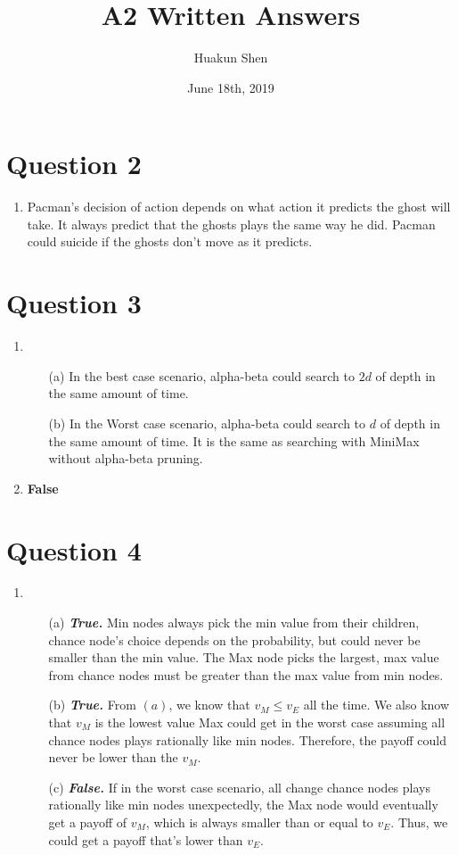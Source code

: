 \documentclass[10pt]{article}
\title{A2 Written Answers}
\author{Huakun Shen}
\date{June 18th, 2019}
\begin{document}
\maketitle
\section*{Question 2}
\begin{enumerate}
\item Pacman's decision of action depends on what action it predicts the ghost will take. It always predict that the ghosts plays the same way he did. Pacman could suicide if the ghosts don't move as it predicts.
\end{enumerate}
\section*{Question 3}
\begin{enumerate}
\item 
	\begin{enumerate}
		\item[(a)] In the best case scenario, alpha-beta could search to $2d$ of depth in the same amount of time.
		\item[(b)] In the Worst case scenario, alpha-beta could search to $d$ of depth in the same amount of time. It is the same as searching with MiniMax without alpha-beta pruning.
	\end{enumerate}
\item \textbf{False}
\end{enumerate}
\section*{Question 4}
\begin{enumerate}
\item
	\begin{enumerate}
	\item[(a)] \textbf{\textit{True.}} Min nodes always pick the min value from their children, chance node's choice depends on the probability, but could never be smaller than the min value. The Max node picks the largest, max value from chance nodes must be greater than the max value from min nodes.
	\item[(b)] \textbf{\textit{True.}} From $(a)$, we know that $v_M\leq v_E$ all the time. We also know that $v_M$ is the lowest value Max could get in the worst case assuming all chance nodes plays rationally like min nodes. Therefore, the payoff could never be lower than the $v_M$.
	\item[(c)] \textbf{\textit{False.}} If in the worst case scenario, all change chance nodes plays rationally like min nodes unexpectedly, the Max node would eventually get a payoff of $v_M$, which is always smaller than or equal to $v_E$. Thus, we could get a payoff that's lower than $v_E$.
	\end{enumerate}
\end{enumerate}
\end{document}
